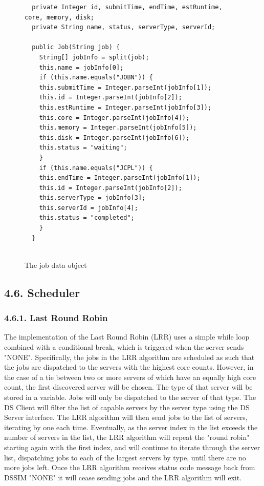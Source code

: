 \documentclass[a4paper]{article} %
\begin{document}
\begin{figure}[ht!]
\begin{lstlisting}
  private Integer id, submitTime, endTime, estRuntime, core, memory, disk;
  private String name, status, serverType, serverId;

  public Job(String job) {
    String[] jobInfo = split(job);
    this.name = jobInfo[0];
    if (this.name.equals("JOBN")) {
    this.submitTime = Integer.parseInt(jobInfo[1]);
    this.id = Integer.parseInt(jobInfo[2]);
    this.estRuntime = Integer.parseInt(jobInfo[3]);
    this.core = Integer.parseInt(jobInfo[4]);
    this.memory = Integer.parseInt(jobInfo[5]);
    this.disk = Integer.parseInt(jobInfo[6]);
    this.status = "waiting";
    }
    if (this.name.equals("JCPL")) {
    this.endTime = Integer.parseInt(jobInfo[1]);
    this.id = Integer.parseInt(jobInfo[2]);
    this.serverType = jobInfo[3];
    this.serverId = jobInfo[4];
    this.status = "completed";
    }
  }
  
\end{lstlisting}
\caption{The job data object}
\end{figure}

\subsection*{4.6. Scheduler}
\subsubsection*{4.6.1. Last Round Robin}
The implementation of the Last Round Robin (LRR) uses a simple while loop combined with a conditional break, which is triggered when the server sends "NONE". Specifically, the jobs in the LRR algorithm are scheduled as such that the jobs are dispatched to the servers with the highest core counts. However, in the case of a tie between two or more servers of which have an equally high core count, the first discovered server will be chosen. The type of that server will be stored in a variable. Jobs will only be dispatched to the server of that type. The DS Client will filter the list of capable servers by the server type using the DS Server interface. The LRR algorithm will then send jobs to the list of servers, iterating by one each time. Eventually, as the server index in the list exceeds the number of servers in the list, the LRR algorithm will repeat the "round robin" starting again with the first index, and will continue to iterate through the server list, dispatching jobs to each of the largest servers by type, until there are no more jobs left. Once the LRR algorithm receives status code message back from DSSIM "NONE" it will cease sending jobs and the LRR algorithm will exit.
\end{document}

